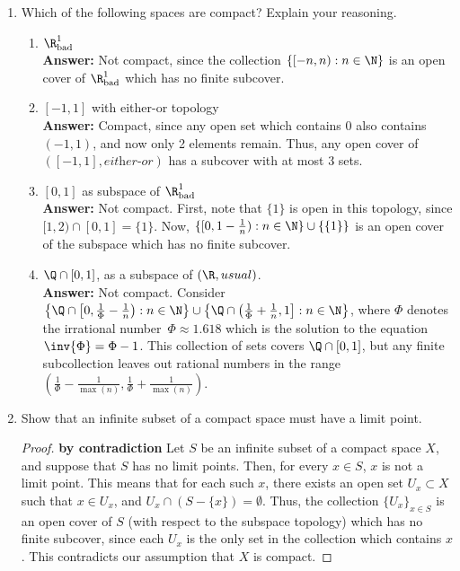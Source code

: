 \documentclass[letterpaper]{article}
\newcommand{\Rbad}{\R_\text{bad}}
\begin{document}
\begin{enumerate}
\item Which of the following spaces are compact? Explain your reasoning. 
	\begin{enumerate}
	\item $\Rbad^1$\\
	\textbf{Answer:} Not compact, since the collection $\{[-n,n) : n\in\N\}$ is an open cover of $\Rbad^1$ which has no finite subcover. 	
	\item $[-1,1]$ with either-or topology\\
	\textbf{Answer:} Compact, since any open set which contains 0 also contains $(-1,1)$, and now only 2 elements remain. Thus, any open cover of $([-1,1], \textit{either-or})$ has a subcover with at most 3 sets. 
	\item $[0,1]$ as subspace of $\Rbad^1$\\
	\textbf{Answer:} Not compact. First, note that $\{1\}$ is open in this topology, since $[1,2)\cap[0,1]=\{1\}$. Now, $\{[0,1-\frac{1}{n}):n\in\N\}\cup \{\{1\}\}$ is an open cover of the subspace which has no finite subcover.
	\item $\Q\cap[0,1]$, as a subspace of $(\R,usual)$.\\
	\textbf{Answer:} Not compact. Consider $\left\lbrace \Q\cap\left[0,\frac{1}{\Phi}-\frac{1}{n}\right) : n\in\N\right\rbrace\cup\left\lbrace\Q\cap\left(\frac{1}{\Phi}+\frac{1}{n},1\right] : n\in\N\right\rbrace$, where $\Phi$ denotes the irrational number\footnotemark \  $\Phi\approx1.618$ which is the solution to the equation $\inv{\Phi}=\Phi-1$. 
	This collection of sets covers $\Q\cap[0,1]$, but any finite subcollection leaves out rational numbers in the range $\left(\frac{1}{\Phi}-\frac{1}{\max(n)},\frac{1}{\Phi}+\frac{1}{\max(n)}\right)$. 
	\end{enumerate}

\setcounter{enumi}{6}
\item Show that an infinite subset of a compact space must have a limit point.
\begin{proof}\textbf{by contradiction}
Let $S$ be an infinite subset of a compact space $X$, and suppose that $S$ has no limit points. Then, for every $x\in S$, $x$ is not a limit point. This means that for each such $x$, there exists an open set $U_x\subset X$ such that $x\in U_x$, and $U_x\cap (S-\{x\})=\emptyset$. Thus, the collection $\{U_x\}_{x\in S}$ is an open cover of $S$ (with respect to the subspace topology) which has no finite subcover, since each $U_x$ is the only set in the collection which contains $x$. This contradicts our assumption that $X$ is compact. 
\end{proof}

\end{enumerate}
\end{document}

